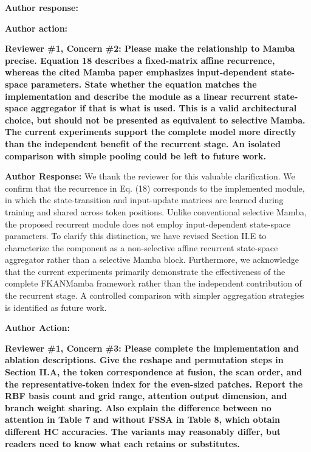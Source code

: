 \documentclass[a4paper,onecolumn,11pt]{IEEEtran}
\begin{document}
\textbf{Author response:}


\textbf{Author action:}



\vspace{1.5em}

{\color{reviewgreen}\textbf{Reviewer \#1, Concern \#2: Please make the relationship to Mamba precise. Equation 18 describes a fixed-matrix affine recurrence, whereas the cited Mamba paper emphasizes input-dependent state-space parameters. State whether the equation matches the implementation and describe the module as a linear recurrent state-space aggregator if that is what is used. This is a valid architectural choice, but should not be presented as equivalent to selective Mamba. The current experiments support the complete model more directly than the independent benefit of the recurrent stage. An isolated comparison with simple pooling could be left to future work.}}

\textbf{Author Response:}
We thank the reviewer for this valuable clarification. We confirm that the recurrence in Eq. (18) corresponds to the implemented module, in which the state-transition and input-update matrices are learned during training and shared across token positions. Unlike conventional selective Mamba, the proposed recurrent module does not employ input-dependent state-space parameters. To clarify this distinction, we have revised Section II.E to characterize the component as a non-selective affine recurrent state-space aggregator rather than a selective Mamba block. Furthermore, we acknowledge that the current experiments primarily demonstrate the effectiveness of the complete FKANMamba framework rather than the independent contribution of the recurrent stage. A controlled comparison with simpler aggregation strategies is identified as future work.

\textbf{Author Action:}



\vspace{1.5em}
{\color{reviewgreen}\textbf{Reviewer \#1, Concern \#3: Please complete the implementation and ablation descriptions. Give the reshape and permutation steps in Section II.A, the token correspondence at fusion, the scan order, and the representative-token index for the even-sized patches. Report the RBF basis count and grid range, attention output dimension, and branch weight sharing. Also explain the difference between no attention in Table 7 and without FSSA in Table 8, which obtain different HC accuracies. The variants may reasonably differ, but readers need to know what each retains or substitutes.}}
\end{document}
